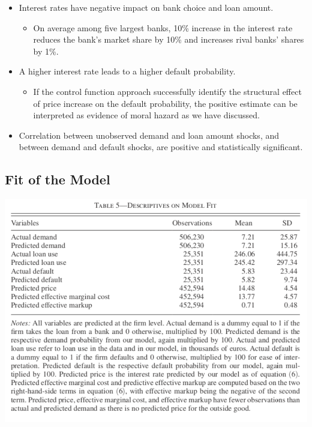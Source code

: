 \documentclass[
]{book}
\providecommand{\tightlist}{%
  \setlength{\itemsep}{0pt}\setlength{\parskip}{0pt}}
\begin{document}
\begin{itemize}
\tightlist
\item
  Interest rates have negative impact on bank choice and loan amount.

  \begin{itemize}
  \tightlist
  \item
    On average among five largest banks, 10\% increase in the interest rate reduces the bank's market share by 10\% and increases rival banks' shares by 1\%.
  \end{itemize}
\item
  A higher interest rate leads to a higher default probability.

  \begin{itemize}
  \tightlist
  \item
    If the control function approach successfully identify the structural effect of price increase on the default probability, the positive estimate can be interpreted as evidence of moral hazard as we have discussed.
  \end{itemize}
\item
  Correlation between unobserved demand and loan amount shocks, and between demand and default shocks, are positive and statistically significant.
\end{itemize}

\hypertarget{fit-of-the-model}{%
\subsection{Fit of the Model}\label{fit-of-the-model}}

\includegraphics{figuretable/Crawford_2018_Table5.png}
\end{document}
